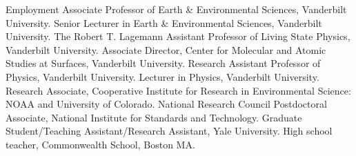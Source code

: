 %
%
\begin{rubric}{Employment}
\entry*[2009--]Associate Professor of Earth \& Environmental Sciences, Vanderbilt University.
\entry*[2003--2009]Senior Lecturer in Earth \& Environmental Sciences, Vanderbilt University.
\entry*[2000--2003]The Robert T. Lagemann Assistant Professor of Living State Physics, Vanderbilt University.
\entry*[1996--1998]Associate Director, Center for Molecular and Atomic Studies at Surfaces, Vanderbilt University.
\entry*[1995--2000]Research Assistant Professor of Physics, Vanderbilt University.
\entry*[1994--1995]Lecturer in Physics, Vanderbilt University.
\entry*[1993--1994]Research Associate, Cooperative Institute for Research in Environmental Science: NOAA and University of Colorado.
\entry*[1991--1993]National Research Council Postdoctoral Associate, National Institute for Standards and Technology.
\entry*[1985--1991]Graduate Student/Teaching Assistant/Research Assistant, Yale University.
\entry*[1983--1985]High school teacher, Commonwealth School, Boston MA.
\end{rubric}
